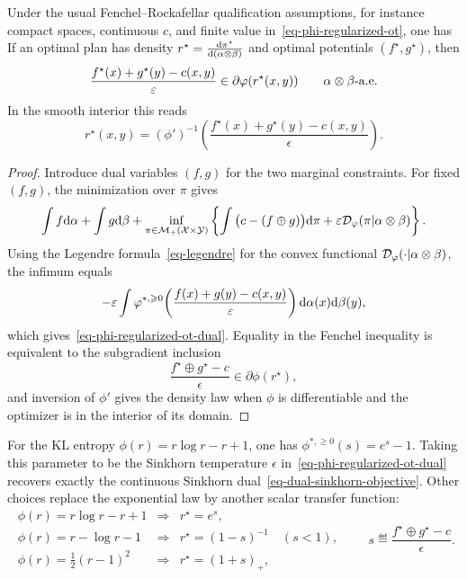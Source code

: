 \begin{prop}\label{prop-phi-regularized-ot-dual}
	Under the usual Fenchel--Rockafellar qualification assumptions, for instance compact spaces, continuous $c$, and finite value in~\eqref{eq-phi-regularized-ot}, one has
	If an optimal plan has density $r^\star=\frac{\mathrm{d}\pi^\star}{\mathrm{d}(\alpha\otimes\beta)}$ and optimal potentials $(f^\star,g^\star)$, then
	\[
		\frac{f^\star(x)+g^\star(y)-c(x,y)}{\varepsilon}
		\in
		\partial\varphi(r^\star(x,y))
		\qquad
		\alpha\otimes\beta\text{-a.e.}
	\]
	In the smooth interior this reads
	\[
		r^\star(x,y)
		=
		(\phi')^{-1}
		\!\left(\frac{f^\star(x)+g^\star(y)-c(x,y)}{\epsilon}\right).
	\]
\end{prop}

\begin{proof}
	Introduce dual variables $(f,g)$ for the two marginal constraints. For fixed $(f,g)$, the minimization over $\pi$ gives
	\[
		\int f\mathrm{d}\alpha+\int g\mathrm{d}\beta
		+
		\inf_{\pi\in\mathcal{M}_+(\mathcal{X}\times\mathcal{Y})}
		\left\{
		\int\big(c-(f\oplus g)\big)\mathrm{d}\pi
		+
		\varepsilon\mathcal{D}_\varphi(\pi|\alpha\otimes\beta)
		\right\}.
	\]
	Using the Legendre formula~\eqref{eq-legendre} for the convex functional $\mathcal{D}_\varphi(\cdot|\alpha\otimes\beta)$, the infimum equals
	\[
		-\varepsilon
		\int
		\varphi^{*,\geqslant0}\!\left(\frac{f(x)+g(y)-c(x,y)}{\varepsilon}\right)
		\mathrm{d}\alpha(x)\mathrm{d}\beta(y),
	\]
	which gives~\eqref{eq-phi-regularized-ot-dual}. Equality in the Fenchel inequality is equivalent to the subgradient inclusion
	\[
		\frac{f^\star\oplus g^\star-c}{\epsilon}
		\in
		\partial\phi(r^\star),
	\]
	and inversion of $\phi'$ gives the density law when $\phi$ is differentiable and the optimizer is in the interior of its domain.
\end{proof}

For the KL entropy $\phi(r)=r\log r-r+1$, one has $\phi^{*,\geq0}(s)=e^s-1$. Taking this parameter to be the Sinkhorn temperature $\epsilon$ in~\eqref{eq-phi-regularized-ot-dual} recovers exactly the continuous Sinkhorn dual~\eqref{eq-dual-sinkhorn-objective}. Other choices replace the exponential law by another scalar transfer function:
\[
\begin{array}{lll}
	\phi(r)=r\log r-r+1 &\Rightarrow& r^\star=e^s,\\[.25em]
	\phi(r)=r-\log r-1 &\Rightarrow& r^\star=(1-s)^{-1}\quad (s<1),\\[.25em]
	\phi(r)=\frac12(r-1)^2 &\Rightarrow& r^\star=(1+s)_+,
\end{array}
\qquad
s\eqdef\frac{f^\star\oplus g^\star-c}{\epsilon}.
\]


